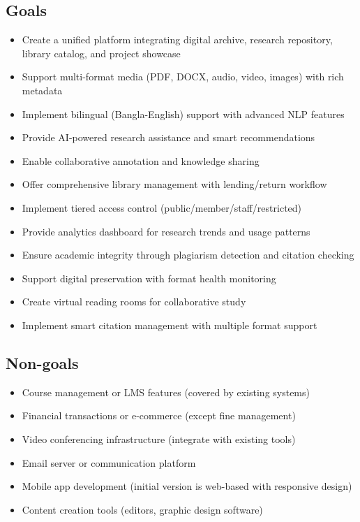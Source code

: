 \documentclass[12pt,a4paper]{report}
\begin{document}
\subsection{Goals}
\begin{itemize}
    \item Create a unified platform integrating digital archive, research repository, library catalog, and project showcase
    \item Support multi-format media (PDF, DOCX, audio, video, images) with rich metadata
    \item Implement bilingual (Bangla-English) support with advanced NLP features
    \item Provide AI-powered research assistance and smart recommendations
    \item Enable collaborative annotation and knowledge sharing
    \item Offer comprehensive library management with lending/return workflow
    \item Implement tiered access control (public/member/staff/restricted)
    \item Provide analytics dashboard for research trends and usage patterns
    \item Ensure academic integrity through plagiarism detection and citation checking
    \item Support digital preservation with format health monitoring
    \item Create virtual reading rooms for collaborative study
    \item Implement smart citation management with multiple format support
\end{itemize}

\subsection{Non-goals}
\begin{itemize}
    \item Course management or LMS features (covered by existing systems)
    \item Financial transactions or e-commerce (except fine management)
    \item Video conferencing infrastructure (integrate with existing tools)
    \item Email server or communication platform
    \item Mobile app development (initial version is web-based with responsive design)
    \item Content creation tools (editors, graphic design software)
\end{itemize}
\end{document}
